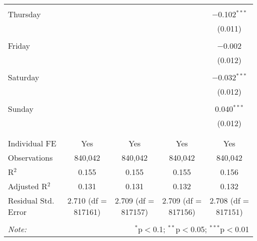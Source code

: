 \documentclass[
]{article}
\begin{document}
\begin{table}[!htbp]
{\begin{tabular}{@{\extracolsep{5pt}}lcccc}
  & & & & \\ 
 Thursday &  &  &  & $-$0.102$^{***}$ \\ 
  &  &  &  & (0.011) \\ 
  & & & & \\ 
 Friday &  &  &  & $-$0.002 \\ 
  &  &  &  & (0.012) \\ 
  & & & & \\ 
 Saturday &  &  &  & $-$0.032$^{***}$ \\ 
  &  &  &  & (0.012) \\ 
  & & & & \\ 
 Sunday &  &  &  & 0.040$^{***}$ \\ 
  &  &  &  & (0.012) \\ 
  & & & & \\ 
\hline \\[-1.8ex] 
Individual FE & Yes & Yes & Yes & Yes \\ 
Observations & 840,042 & 840,042 & 840,042 & 840,042 \\ 
R$^{2}$ & 0.155 & 0.155 & 0.155 & 0.156 \\ 
Adjusted R$^{2}$ & 0.131 & 0.131 & 0.132 & 0.132 \\ 
Residual Std. Error & 2.710 (df = 817161) & 2.709 (df = 817157) & 2.709 (df = 817156) & 2.708 (df = 817151) \\ 
\hline 
\hline \\[-1.8ex] 
\textit{Note:}  & \multicolumn{4}{r}{$^{*}$p$<$0.1; $^{**}$p$<$0.05; $^{***}$p$<$0.01} \\ 
\end{tabular}
} 
\end{table} 
\newpage
\end{document}
